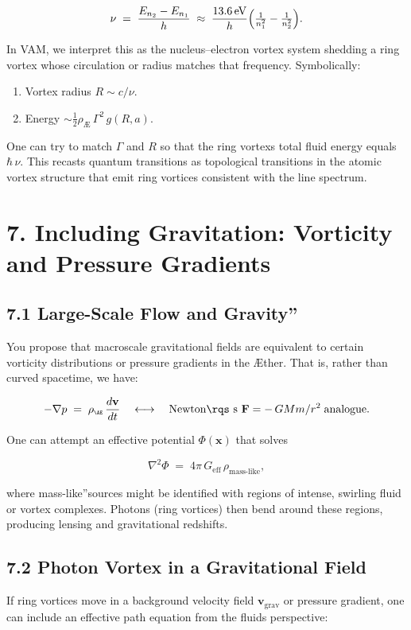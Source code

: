 \[
 \nu \;=\; \frac{E_{n_2}-E_{n_1}}{h} \;\approx\; \frac{13.6\,\mathrm{eV}}{h} \Bigl(\tfrac{1}{n_1^2}-\tfrac{1}{n_2^2}\Bigr).
\]

In VAM, we interpret this as the nucleus–electron vortex system shedding a ring vortex whose circulation or radius matches that frequency. Symbolically:

\begin{enumerate}
 \item Vortex radius \(R \sim c/\nu\).
 \item Energy \(\sim \tfrac12 \rho_{\scriptscriptstyle\mathrm{Æ}}\,\Gamma^2\,g(R,a)\).
\end{enumerate}

One can try to match \(\Gamma\) and \(R\) so that the ring vortex\rqs s total fluid energy equals \(\hbar\,\nu\). This recasts quantum transitions as topological transitions in the atomic vortex structure that emit ring vortices consistent with the line spectrum.

\section*{7. Including Gravitation: Vorticity and Pressure Gradients}
\subsection*{7.1 Large-Scale Flow and \grqq Gravity\textquotedblright}
You propose that macroscale gravitational fields are equivalent to certain vorticity distributions or pressure gradients in the Æther. That is, rather than curved spacetime, we have:

\[
 -\nabla p \;=\; \rho_{\scriptscriptstyle \mathrm{Æ}}\, \frac{d\mathbf{v}}{dt} \quad\longleftrightarrow\quad \text{Newton\rqs s } \mathbf{F}=-\,GMm/r^2\;\text{analogue}.
\]

One can attempt an effective potential \(\Phi(\mathbf{x})\) that solves

\[
 \nabla^2 \Phi \;=\; 4\pi\,G_\text{eff}\,\rho_\text{mass-like},
\]

where \grqq mass-like\textquotedblright sources might be identified with regions of intense, swirling fluid or vortex complexes. Photons (ring vortices) then bend around these regions, producing lensing and gravitational redshifts.

\subsection*{7.2 Photon Vortex in a Gravitational Field}
If ring vortices move in a background velocity field \(\mathbf{v}_{\mathrm{grav}}\) or pressure gradient, one can include an effective path equation from the fluid\rqs s perspective:

